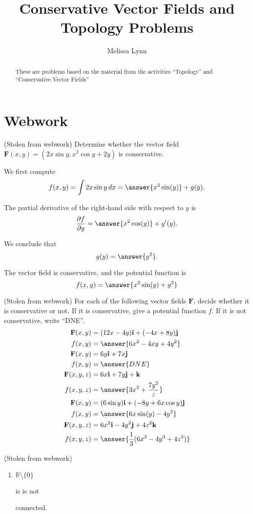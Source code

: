 \documentclass{ximera}
\title{Conservative Vector Fields and Topology Problems}
\author{Melissa Lynn}
\begin{document}
  
\begin{abstract}  
These are problems based on the material from the activities ``Topology'' and ``Conservative Vector Fields''
\end{abstract}  
\maketitle

\section{Webwork}

\begin{problem}
(Stolen from webwork) Determine whether the vector field $\mathbf{F}(x,y) = (2x\sin y,x^2\cos y + 2y)$ is conservative.

We first compute 
\[
f(x,y)=\int 2x\sin y\, dx = \answer{x^2\sin(y)}+g(y).
\]
\begin{problem}
The partial derivative of the right-hand side with respect to $y$ is
\[
\frac{\partial f}{\partial y} = \answer{x^2\cos(y)}+g'(y).
\]
\begin{problem}
We conclude that
\[
g(y) = \answer{y^2}.
\]
\begin{problem}
The vector field is conservative, and the potential function is
\[
f(x,y) = \answer{x^2\sin(y)+y^2}
\]
\end{problem}
\end{problem}
\end{problem}
\end{problem}

\begin{problem}
(Stolen from webwork) For each of the following vector fields $\mathbf{F}$, decide whether it is conservative or not. If it is conservative, give a potential function $f$. If it is not conservative, write ``DNE''.
\begin{align}
\mathbf{F}(x,y) &= (12x-4y)\mathbf{i} + (-4x+8y)\mathbf{j}\\
f(x,y) &=  \answer{6x^2-4xy+4y^2}\\
\mathbf{F}(x,y) &= 6y\mathbf{i} + 7x\mathbf{j}\\
f(x,y) &= \answer{DNE}\\
\mathbf{F}(x,y,z) &= 6x\mathbf{i} + 7y\mathbf{j} + \mathbf{k}\\
f(x,y,z) &= \answer{3x^2+\frac{7y^2}{z}}\\
\mathbf{F}(x,y) &=(6\sin y)\mathbf{i} + (-8y+6x\cos y)\mathbf{j}\\
f(x,y) &= \answer{6x\sin(y)-4y^2}\\
\mathbf{F}(x,y,z) &= 6x^2\mathbf{i}-4y^2\mathbf{j}+4z^2\mathbf{k}\\
f(x,y,z) &= \answer{\frac{1}{3}(6x^3-4y^3+4z^3)}
\end{align}
\end{problem}

\begin{problem}
(Stolen from webwork)
\begin{enumerate}
\item $\mathbb{R}\setminus \{0\}$\begin{dropdown}
\wordchoice is
\wordchoice[correct] is not
\end{dropdown} connected.
\end{enumerate}
\end{problem}
\end{document}
